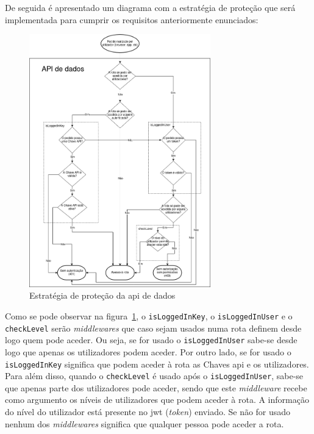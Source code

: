 De seguida é apresentado um diagrama com a estratégia de proteção que será implementada para cumprir os requisitos 
anteriormente enunciados:
\begin{figure}[H]
    \centering
    \includegraphics[width=0.7\textwidth]{img/protecaoStrag.png}
    \caption{Estratégia de proteção da \acrshort{api} de dados}\label{fig:protStrag}
\end{figure}

Como se pode observar na figura~\ref{fig:protStrag}, o \texttt{isLoggedInKey}, o \texttt{isLoggedInUser} e o \texttt{checkLevel} serão \textit{middlewares} que caso 
sejam usados numa rota definem desde logo quem pode aceder. 
Ou seja, se for usado o \texttt{isLoggedInUser} sabe-se desde logo que apenas os utilizadores podem aceder. 
Por outro lado, se for usado o \texttt{isLoggedInKey} significa que podem aceder à rota as Chaves \acrshort{api} e 
os utilizadores. Para além disso, quando o \texttt{checkLevel} é usado após o \texttt{isLoggedInUser}, sabe-se que 
apenas parte dos utilizadores pode aceder, sendo que este \textit{middleware} recebe como argumento os níveis de 
utilizadores que podem aceder à rota. A informação do nível do utilizador está presente no \acrshort{jwt} 
(\textit{token}) enviado. Se não for usado nenhum dos \textit{middlewares} significa que qualquer pessoa pode aceder a rota.


